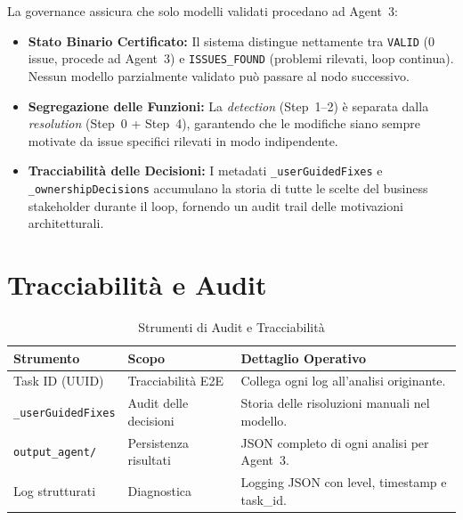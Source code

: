 \documentclass[12pt,a4paper]{report}
\begin{document}
La governance assicura che solo modelli validati procedano ad Agent~3:

\begin{itemize}
  \item \textbf{Stato Binario Certificato:} Il sistema distingue nettamente
        tra \texttt{VALID} (0 issue, procede ad Agent~3) e \texttt{ISSUES\_FOUND}
        (problemi rilevati, loop continua). Nessun modello parzialmente validato
        può passare al nodo successivo.

  \item \textbf{Segregazione delle Funzioni:} La \textit{detection} (Step~1--2)
        è separata dalla \textit{resolution} (Step~0 + Step~4), garantendo
        che le modifiche siano sempre motivate da issue specifici rilevati in
        modo indipendente.

  \item \textbf{Tracciabilità delle Decisioni:} I metadati
        \texttt{\_userGuidedFixes} e \texttt{\_ownershipDecisions} accumulano
        la storia di tutte le scelte del business stakeholder durante il loop,
        fornendo un audit trail delle motivazioni architetturali.
\end{itemize}

\section{Tracciabilità e Audit}

\begin{table}[H]
\centering
\renewcommand{\arraystretch}{1.3}
\begin{tabularx}{\textwidth}{l l X}
\toprule
\textbf{Strumento} & \textbf{Scopo} & \textbf{Dettaglio Operativo} \\
\midrule
Task ID (UUID) & Tracciabilità E2E & Collega ogni log all'analisi originante. \\
\texttt{\_userGuidedFixes} & Audit delle decisioni & Storia delle risoluzioni manuali nel modello. \\
\texttt{output\_agent/} & Persistenza risultati & JSON completo di ogni analisi per Agent~3. \\
Log strutturati & Diagnostica & Logging JSON con level, timestamp e task\_id. \\
\bottomrule
\end{tabularx}
\caption{Strumenti di Audit e Tracciabilità}
\label{tab:audit-tools}
\end{table}

\end{document}
